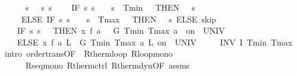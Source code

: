 \documentclass[envcountsame,envcountsect]{llncs}
\begin{document}
\begin{example}
\begin{isabellebody}
\isanewline
\ \ \ \ {\isacharparenleft}{}\ {\isacharcolon}{\isacharcolon}{\isacharequal}\ {\isacharparenleft}{\isasymlambda}s{\isachardot}\ {}{\isacharparenright}{\isacharparenright}{\isacharsemicolon}{\isacharparenleft}{}\ {\isacharcolon}{\isacharcolon}{\isacharequal}\ {\isacharparenleft}{\isasymlambda}s{\isachardot}\ s{\isachardollar}{}{\isacharparenright}{\isacharparenright}{\isacharsemicolon}\isanewline
\ \ \ \ {\isacharparenleft}IF\ {\isacharparenleft}{\isasymlambda}s{\isachardot}\ s{\isachardollar}{}\ {\isacharequal}\ {}\ {\isasymand}\ s{\isachardollar}{}\ {\isasymle}\ Tmin\ {\isacharplus}\ {}{\isacharparenright}\ THEN\ {\isacharparenleft}{}\ {\isacharcolon}{\isacharcolon}{\isacharequal}\ {\isacharparenleft}{\isasymlambda}s{\isachardot}{}{\isacharparenright}{\isacharparenright}\ \isanewline
\ \ \ \ \ ELSE\ IF\ {\isacharparenleft}{\isasymlambda}s{\isachardot}\ s{\isachardollar}{}\ {\isacharequal}\ {}\ {\isasymand}\ s{\isachardollar}{}\ {\isasymge}\ Tmax\ {\isacharminus}\ {}{\isacharparenright}\ THEN\ {\isacharparenleft}{}\ {\isacharcolon}{\isacharcolon}{\isacharequal}\ {\isacharparenleft}{\isasymlambda}s{\isachardot}{}{\isacharparenright}{\isacharparenright}\ ELSE\ skip{\isacharparenright}{\isacharsemicolon}\isanewline
\ \ \ \ %
\isanewline
\ \ \ \ {\isacharparenleft}IF\ {\isacharparenleft}{\isasymlambda}s{\isachardot}\ s{\isachardollar}{}\ {\isacharequal}\ {}{\isacharparenright}\ THEN\ {\isacharparenleft}x{\isasymacute}{\isacharequal}\ f\ a\ {}\ {\isacharampersand}\ G\ Tmin\ Tmax\ a\ {}\ on\ {\isacharbraceleft}{}{\isachardot}{\isachardot}{\isasymtau}{\isacharbraceright}\ UNIV\ {\isacharat}\ {}{\isacharparenright}\ \isanewline
\ \ \ \ ELSE\ {\isacharparenleft}x{\isasymacute}{\isacharequal}\ f\ a\ L\ {\isacharampersand}\ G\ Tmin\ Tmax\ a\ L\ on\ {\isacharbraceleft}{}{\isachardot}{\isachardot}{\isasymtau}{\isacharbraceright}\ UNIV\ {\isacharat}\ {}{\isacharparenright}{\isacharparenright}\isanewline
\ \ {\isacharparenright}\ INV\ I\ Tmin\ Tmax{\isacharparenright}{\isachardoublequoteclose}\isanewline
\ \isamarkupfalse%
\ {\isacharparenleft}intro\ order{\isacharunderscore}trans{\isacharbrackleft}OF\ {\isacharunderscore}\ R{\isacharunderscore}therm{\isacharunderscore}loop{\isacharbrackright}\ R{\isacharunderscore}loop{\isacharunderscore}mono\ \isanewline
\ \ \ \ \ \ R{\isacharunderscore}seq{\isacharunderscore}mono\ R{\isacharunderscore}therm{\isacharunderscore}ctrl\ R{\isacharunderscore}therm{\isacharunderscore}dyn{\isacharbrackleft}OF\ assms{\isacharbrackright}{\isacharparenright}\isanewline
\end{isabellebody}


\end{example}
\end{document}
